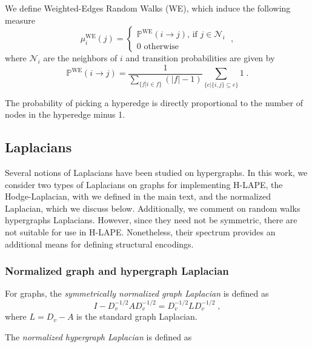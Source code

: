 We define Weighted-Edges Random Walks (WE), which induce the following measure
\begin{equation}\label{measures-we}
\mu_i^{\text{WE}}(j) = \begin{cases} 
\mathbb{P}^{\text{WE}}(i \rightarrow j) \text{,} \text{ if } j 
\in \mathcal{N}_i \\
0 \text{ otherwise} 
\end{cases} \; ,
\end{equation}
where $\mathcal{N}_i$ are the neighbors of $i$ and transition probabilities are given by
\begin{equation}
\mathbb{P}^{\text{WE}}(i \rightarrow j)  = \frac{1}{\sum_{ \{f|i \in f \}}(|f|-1)} \sum_{\{e | \{i,j\} \subseteq e\}} 1 \; .
\end{equation}

The probability of picking a hyperedge is directly proportional to the number of nodes in the hyperedge minus 1.


\subsection{Laplacians}\label{Laplacians}
Several notions of Laplacians have been studied on hypergraphs. In this work, we consider two types of Laplacians on graphs for implementing H-LAPE, the Hodge-Laplacian, with we defined in the main text, and the normalized Laplacian, which we discuss below. Additionally, we comment on random walks hypergraphs Laplacians. However, since they need not be symmetric, there are not suitable for use in H-LAPE. Nonetheless, their spectrum provides an additional means for defining structural encodings. 

\subsubsection{Normalized graph and hypergraph Laplacian}\label{laplacians-appendix}

\noindent For graphs, the \emph{symmetrically normalized graph Laplacian} is defined as
\begin{equation} 
I-D_v^{-1/2}AD_v^{-1/2} =  D_v^{-1/2}LD_v^{-1/2} \; ,
\end{equation}
where $L = D_v - A$ is the standard graph Laplacian.



The \emph{normalized hypergraph Laplacian} \citep{zhou2006learning, feng2019hypergraph} is defined as


